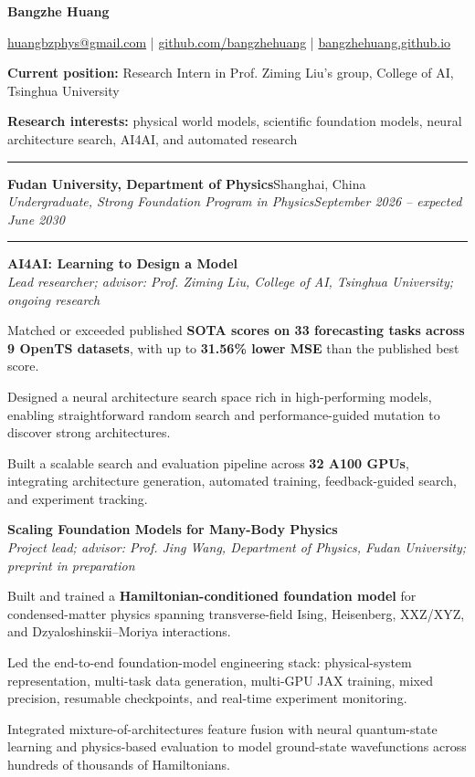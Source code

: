 \documentclass[10pt,a4paper]{article}
\let\originalitemize\itemize
\let\endoriginalitemize\enditemize
\renewenvironment{itemize}
  {\originalitemize
   \setlength{\itemsep}{1.4pt}
   \setlength{\topsep}{2.2pt}
   \setlength{\parsep}{0pt}
   \setlength{\partopsep}{0pt}}
  {\endoriginalitemize}
\newcommand{\cvname}[1]{{\LARGE\bfseries #1}\par}
\newcommand{\cvsection}[1]{
  \vspace{0.48em}{\large\bfseries #1}\par
  \vspace{0.08em}\hrule\vspace{0.3em}
}
\newcommand{\entry}[4]{
  \textbf{#1}\hfill #2\\[-0.05em]
  \textit{#3}\hfill\textit{#4}
}
\newcommand{\project}[2]{
  \textbf{#1}\\[-1pt]
  \textit{#2}
}
\begin{document}
\cvname{Bangzhe Huang}
\vspace{0.1em}
\href{mailto:huangbzphys@gmail.com}{huangbzphys@gmail.com}
\quad|\quad
\href{https://github.com/bangzhehuang}{github.com/bangzhehuang}
\quad|\quad
\href{https://bangzhehuang.github.io/}{bangzhehuang.github.io}

\vspace{0.3em}
\textbf{Current position:} Research Intern in Prof. Ziming Liu's group,
College of AI, Tsinghua University

\textbf{Research interests:} physical world models, scientific foundation
models, neural architecture search, AI4AI, and automated research

\cvsection{Education}

\entry
  {Fudan University, Department of Physics}
  {Shanghai, China}
  {Undergraduate, Strong Foundation Program in Physics}
  {September 2026 -- expected June 2030}

\cvsection{Research Experience}

\project
  {AI4AI: Learning to Design a Model}
  {Lead researcher; advisor: Prof. Ziming Liu, College of AI, Tsinghua University; ongoing research}

\begin{itemize}
  \item Matched or exceeded published \textbf{SOTA scores on 33 forecasting
  tasks across 9 OpenTS datasets}, with up to \textbf{31.56\% lower MSE}
  than the published best score.
  \item Designed a neural architecture search space rich in high-performing
  models, enabling straightforward random search and performance-guided
  mutation to discover strong architectures.
  \item Built a scalable search and evaluation pipeline across \textbf{32 A100
  GPUs}, integrating architecture generation, automated training, feedback-guided
  search, and experiment tracking.
\end{itemize}

\project
  {Scaling Foundation Models for Many-Body Physics}
  {Project lead; advisor: Prof. Jing Wang, Department of Physics, Fudan University; preprint in preparation}

\begin{itemize}
  \item Built and trained a \textbf{Hamiltonian-conditioned foundation model}
  for condensed-matter physics spanning transverse-field Ising, Heisenberg,
  XXZ/XYZ, and Dzyaloshinskii--Moriya interactions.
  \item Led the end-to-end foundation-model engineering stack: physical-system
  representation, multi-task data generation, multi-GPU JAX training,
  mixed precision, resumable checkpoints, and real-time experiment monitoring.
  \item Integrated mixture-of-architectures feature fusion with neural
  quantum-state learning and physics-based evaluation to model ground-state
  wavefunctions across hundreds of thousands of Hamiltonians.
\end{itemize}
\end{document}
